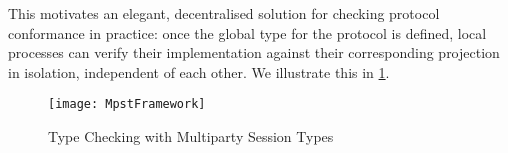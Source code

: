 This motivates an elegant, decentralised solution for 
checking protocol conformance in practice: 
once the global type for the protocol is defined, 
local processes can verify their implementation 
against their corresponding projection in isolation, 
independent of each other. 
We illustrate this in \cref{fig:mpstworkflow}.

\begin{figure}[!ht]
\centering
\texttt{[image: MpstFramework]}
\caption{Type Checking with Multiparty Session Types}
\label{fig:mpstworkflow}
\end{figure}